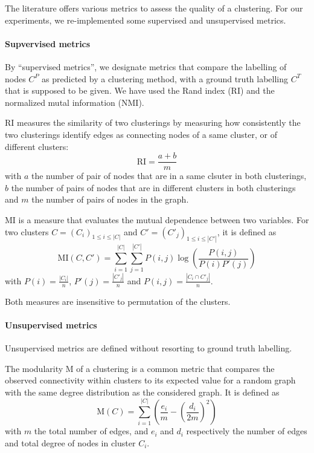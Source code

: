 \documentclass[switch, 12pt]{article}
\begin{document}
\begin{multicols}{2}
    The literature offers various metrics to assess the quality of a clustering. For our experiments, we re-implemented some supervised and unsupervised metrics.

    \paragraph{Supvervised metrics} By ``supervised metrics'', we designate metrics that compare the labelling of nodes $C^P$ as predicted by a clustering method, with a ground truth labelling $C^T$ that is supposed to be given. We have used the Rand index (RI) and the normalized mutal information (NMI).

    RI measures the similarity of two clusterings by measuring how consistently the two clusterings identify edges as connecting nodes of a same cluster, or of different clusters:
    \begin{equation}
        \mathrm{RI} = \frac{a + b}{m}
    \end{equation}
    with $a$ the number of pair of nodes that are in a same clsuter in both clusterings, $b$ the number of pairs of nodes that are in different clusters in both clusterings and $m$ the number of pairs of nodes in the graph.

    MI is a measure that evaluates the mutual dependence between two variables. For two clusters $C = (C_i)_{1 \leq i \leq |C|}$ and $C' = (C'_j)_{1 \leq i \leq |C'|}$, it is defined as
    \begin{equation}
        \mathrm{MI}(C, C') = \sum_{i=1}^{|C|} \sum_{j=1}^{|C'|} P(i, j) \log\left(\frac{P(i,j)}{P(i)P'(j)}\right)
    \end{equation}
    with $P(i) = \frac{|C_i|}{n}$, $P'(j) = \frac{|C'_j|}{n}$ and $P(i,j) = \frac{|C_i \cap C'_j|}{n}$.

    Both measures are insensitive to permutation of the clusters.

    \paragraph{Unsupervised metrics} Unsupervised metrics are defined without resorting to ground truth labelling.

    The modularity M of a clustering is a common metric that compares the observed connectivity within clusters to its expected value for a random graph with the same degree distribution as the considered graph. It is defined as
    \begin{equation}
        \mathrm{M}(C) = \sum_{i=1}^{|C|} \left(\frac{e_i}{m} - \left(\frac{d_i}{2m}\right)^2 \right)
    \end{equation}
    with $m$ the total number of edges, and $e_i$ and $d_i$ respectively the number of edges and total degree of nodes in cluster $C_i$.


\end{multicols}
\end{document}

